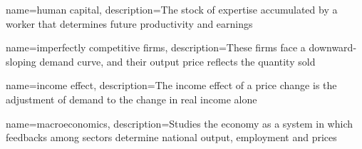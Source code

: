 {
	name={human capital},
	description={The stock of expertise accumulated by a worker that determines future productivity and earnings}
}

{
	name={imperfectly competitive firms},
	description={These firms face a downward-sloping demand curve, and their output price reflects the quantity sold}
}

{
	name={income effect},
	description={The income effect of a price change is the adjustment of demand to the change in real income alone}
}

%
%
%
%
%
%
%
%
%
%
%
%
%
%
%
%
%
%
%
%
%
{
	name=macroeconomics,
	description={Studies the economy as a system in which feedbacks among sectors determine national output, employment and prices}
}